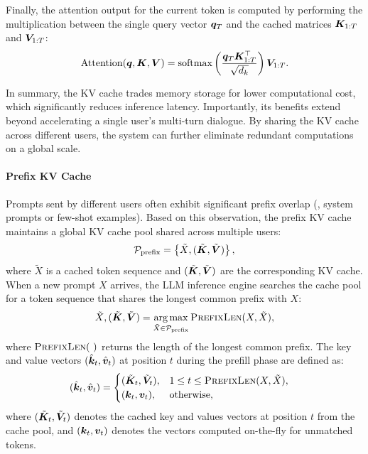 Finally, the attention output for the current token is computed by performing the multiplication between the single query vector $\bm{q}_T$ and the cached matrices $\bm{K}_{1:T}$ and $\bm{V}_{1:T}$:
\begin{align}
    \text{Attention}(\bm{q}, \bm{K}, \bm{V}) = \text{softmax} \left( \frac{\bm{q}_{T} \bm{K}_{1:T}^\top}{\sqrt{d_k}} \right) \bm{V}_{1:T}.
\end{align}

In summary, the KV cache trades memory storage for lower computational cost, which significantly reduces inference latency. Importantly, its benefits extend beyond accelerating a single user's multi-turn dialogue. By sharing the KV cache across different users, the system can further eliminate redundant computations on a global scale.

\paragraph{Prefix KV Cache}  
Prompts sent by different users often exhibit significant prefix overlap (\eg, system prompts or few-shot examples). Based on this observation, the prefix KV cache maintains a global KV cache pool shared across multiple users:
\begin{align}\label{eq:prefix_kv_cache_pool}
    \mathcal{P}_{\text{prefix}} = \left\{\tilde{X}, (\tilde{\bm{K}}, \tilde{\bm{V}})\right\},
\end{align}
where $\tilde{X}$ is a cached token sequence and $(\tilde{\bm{K}}, \tilde{\bm{V}})$ are the corresponding KV cache.
% 
When a new prompt $X$ arrives, the LLM inference engine searches the cache pool for a token sequence that shares the longest common prefix with $X$:
\begin{align} 
    \tilde{X}, (\tilde{\bm{K}}, \tilde{\bm{V}}) = \operatorname*{arg\,max}_{\tilde{X} \in \mathcal{P}_{\text{prefix}}} \textsc{PrefixLen}(X, \tilde{X}),
\end{align}
where $\textsc{PrefixLen}(\ )$ returns the length of the longest common prefix. The key and value vectors $(\hat{\bm{k}}_t, \hat{\bm{v}}_t)$ at position $t$ during the prefill phase are defined as:
\begin{align}\label{eq:prefix_kv}
    (\hat{\bm{k}}_t, \hat{\bm{v}}_t) &= \begin{cases}
        (\tilde{\bm{K}}_t, \tilde{\bm{V}}_t), & 1 \leq t \leq \textsc{PrefixLen}(X, \tilde{X}), \\
        (\bm{k}_t, \bm{v}_t), & \text{otherwise},
    \end{cases}
\end{align}
where $(\tilde{\bm{K}}_t, \tilde{\bm{V}}_t)$ denotes the cached key and values vectors at position $t$ from the cache pool, and $(\bm{k}_t, \bm{v}_t)$ denotes the vectors computed on-the-fly for unmatched tokens.



